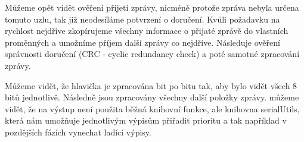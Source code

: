 \documentclass[12pt,titlepage]{article}
\begin{document}
Můžeme opět vidět ověření přijetí zprávy, nicméně protože zpráva nebyla určena tomuto uzlu, tak již neodesíláme potvrzení o doručení. Kvůli požadavku na rychlost nejdříve zkopírujeme všechny informace o přijaté zprávě do vlastních proměnných a umožníme příjem další zprávy co nejdříve. Následuje ověření správnosti doručení (CRC - cyclic redundancy check) a poté samotné zpracování zprávy.

Můžeme vidět, že hlavička je zpracována bit po bitu tak, aby bylo vidět všech 8 bitů jednotlivě. Následně jsou zpracovány všechny další položky zprávy. můžeme vidět, že na výstup není použita běžná knihovní funkce, ale knihovna serialUtils, která nám umožňuje jednotlivým výpisům přiřadit prioritu a tak například v pozdějších fázích vynechat ladící výpisy.
\end{document}
